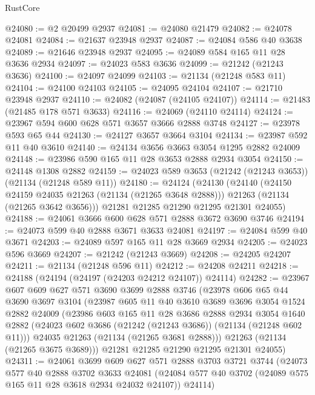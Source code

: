 \begin{lexlean}{RustCore}
\begin{coremodule}
@24080 := @2 @20499 @2937
@24081 := @24080 @21479
@24082 := @24078 @24081
@24084 := @21637 @23948 @2937
@24087 := @24084 @586 @40 @3638
@24089 := @21646 @23948 @2937
@24095 := @24089 @584 @165 @11 @28 @3636 @2934
@24097 := @24023 @583 @3636
@24099 := @21242 (@21243 @3636)
@24100 := @24097 @24099
@24103 := @21134 (@21248 @583 @11)
@24104 := @24100 @24103
@24105 := @24095 @24104
@24107 := @21710 @23948 @2937
@24110 := @24082 (@24087 (@24105 @24107))
@24114 := @21483 (@21485 @178 @571 @3633)
@24116 := @24069 (@24110 @24114)
@24124 := @23967 @594 @600 @628 @571 @3657 @3666 @2888 @3748
@24127 := @23978 @593 @65 @44
@24130 := @24127 @3657 @3664 @3104
@24134 := @23987 @592 @11 @40 @3610
@24140 := @24134 @3656 @3663 @3054 @1295 @2882 @24009
@24148 := @23986 @590 @165 @11 @28 @3653 @2888 @2934 @3054
@24150 := @24148 @1308 @2882
@24159 := @24023 @589 @3653 (@21242 (@21243 @3653)) (@21134 (@21248 @589 @11))
@24180 := @24124
    (@24130
      (@24140
        (@24150 @24159 @24035 @21263 (@21134 (@21265 @3648 @2888)))
        @21263
        (@21134 (@21265 @3642 @3656)))
      @21281
      @21285
      @21290
      @21295
      @21301
      @24055)
@24188 := @24061 @3666 @600 @628 @571 @2888 @3672 @3690 @3746
@24194 := @24073 @599 @40 @2888 @3671 @3633 @24081
@24197 := @24084 @599 @40 @3671
@24203 := @24089 @597 @165 @11 @28 @3669 @2934
@24205 := @24023 @596 @3669
@24207 := @21242 (@21243 @3669)
@24208 := @24205 @24207
@24211 := @21134 (@21248 @596 @11)
@24212 := @24208 @24211
@24218 := @24188 (@24194 (@24197 (@24203 @24212 @24107)) @24114)
@24282 := @23967
    @607
    @609
    @627
    @571
    @3690
    @3699
    @2888
    @3746
    (@23978
      @606
      @65
      @44
      @3690
      @3697
      @3104
      (@23987
        @605
        @11
        @40
        @3610
        @3689
        @3696
        @3054
        @1524
        @2882
        @24009
        (@23986
          @603
          @165
          @11
          @28
          @3686
          @2888
          @2934
          @3054
          @1640
          @2882
          (@24023 @602 @3686 (@21242 (@21243 @3686)) (@21134 (@21248 @602 @11)))
          @24035
          @21263
          (@21134 (@21265 @3681 @2888)))
        @21263
        (@21134 (@21265 @3675 @3689)))
      @21281
      @21285
      @21290
      @21295
      @21301
      @24055)
@24311 := @24061
    @3699
    @609
    @627
    @571
    @2888
    @3703
    @3721
    @3744
    (@24073
      @577
      @40
      @2888
      @3702
      @3633
      @24081
      (@24084 @577 @40 @3702 (@24089 @575 @165 @11 @28 @3618 @2934 @24032 @24107))
      @24114)

\end{coremodule}
\end{lexlean}
